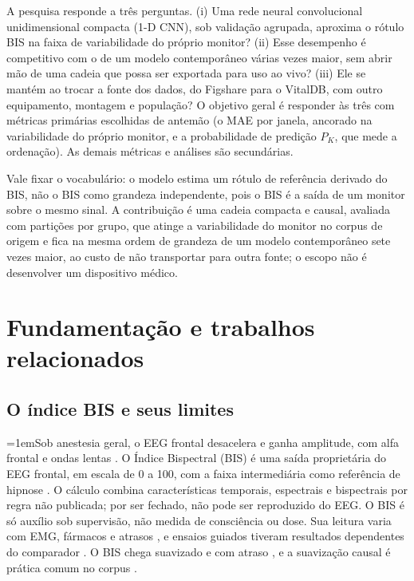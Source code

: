 \documentclass[12pt]{article}
\begin{document}
A pesquisa responde a três perguntas. (i) Uma rede neural convolucional unidimensional compacta (1-D CNN), sob validação agrupada, aproxima o rótulo BIS na faixa de variabilidade do próprio monitor? (ii) Esse desempenho é competitivo com o de um modelo contemporâneo várias vezes maior, sem abrir mão de uma cadeia que possa ser exportada para uso ao vivo? (iii) Ele se mantém ao trocar a fonte dos dados, do Figshare para o VitalDB, com outro equipamento, montagem e população? O objetivo geral é responder às três com métricas primárias escolhidas de antemão (o MAE por janela, ancorado na variabilidade do próprio monitor, e a probabilidade de predição $P_K$, que mede a ordenação). As demais métricas e análises são secundárias.

Vale fixar o vocabulário: o modelo estima um rótulo de referência derivado do BIS, não o BIS como grandeza independente, pois o BIS é a saída de um monitor sobre o mesmo sinal. A contribuição é uma cadeia compacta e causal, avaliada com partições por grupo, que atinge a variabilidade do monitor no corpus de origem e fica na mesma ordem de grandeza de um modelo contemporâneo sete vezes maior, ao custo de não transportar para outra fonte; o escopo não é desenvolver um dispositivo médico.





\section{Fundamentação e trabalhos relacionados}

\subsection{O índice BIS e seus limites}

\begingroup\emergencystretch=1em\relax Sob anestesia geral, o EEG frontal desacelera e ganha amplitude, com alfa frontal e ondas lentas \cite{purdon2015}. O Índice Bispectral (BIS) é uma saída proprietária do EEG frontal, em escala de 0 a 100, com a faixa intermediária como referência de hipnose \cite{johansen2000}. O cálculo combina características temporais, espectrais e bispectrais por regra não publicada; por ser fechado, não pode ser reproduzido do EEG. O BIS é só auxílio sob supervisão, não medida de consciência ou dose. Sua leitura varia com EMG, fármacos e atrasos \cite{schuller2015,hans2005,pilge2006}, e ensaios guiados tiveram resultados dependentes do comparador \cite{baware,bunaware,bagrecall}. O BIS chega suavizado e com atraso \cite{pilge2006}, e a suavização causal é prática comum no corpus \cite{sukriti2026}.
\par\endgroup
\end{document}
